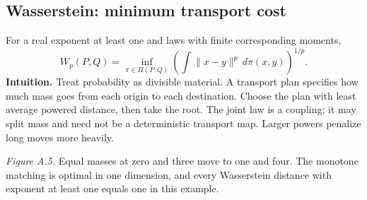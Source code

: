 \documentclass[12pt]{article}
\begin{document}
\clearpage
\subsection{Wasserstein: minimum transport cost}
For a real exponent at least one and laws with finite corresponding moments,
\begin{equation}
 W_p(P,Q)=\inf_{\pi\in\Pi(P,Q)}
 \left(\int\|x-y\|^p\,d\pi(x,y)\right)^{1/p}.
\end{equation}
\textbf{Intuition.} Treat probability as divisible material. A transport
plan specifies how much mass goes from each origin to each destination.
Choose the plan with least average powered distance, then take the root.
The joint law is a coupling; it may split mass and need not be a deterministic
transport map. Larger powers penalize long moves more heavily.

\begin{center}
\end{center}
\textit{Figure A.5.} Equal masses at zero and three move to one and four.
The monotone matching is optimal in one dimension, and every Wasserstein
distance with exponent at least one equals one in this example.
\end{document}
